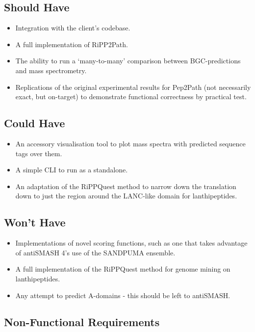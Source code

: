 \documentclass{l4proj}
\begin{document}
\subsection{Should Have}

\begin{itemize}
\item Integration with the client's codebase.
\item A full implementation of RiPP2Path.
\item The ability to run a `many-to-many' comparison between BGC-predictions and mass spectrometry.
\item Replications of the original experimental results for Pep2Path (not necessarily exact, but on-target) to demonstrate functional correctness by practical test.
\end{itemize}

\subsection{Could Have}

\begin{itemize}
\item An accessory visualisation tool to plot mass spectra with predicted sequence tags over them.
\item A simple CLI to run as a standalone.
\item An adaptation of the RiPPQuest method to narrow down the translation down to just the region around the LANC-like domain for lanthipeptides.
\end{itemize}

\subsection{Won't Have}

\begin{itemize}
\item Implementations of novel scoring functions, such as one that takes advantage of antiSMASH 4's use of the SANDPUMA ensemble.
\item A full implementation of the RiPPQuest method for genome mining on lanthipeptides.
\item Any attempt to predict A-domains - this should be left to antiSMASH.
\end{itemize}

\subsection{Non-Functional Requirements}
\end{document}
